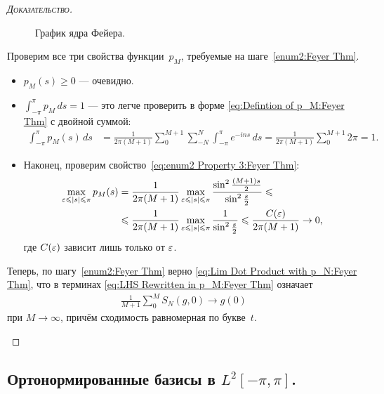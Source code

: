 \documentclass[../complex-analysis.tex]{subfiles}
\begin{document}
\begin{proof}[\normalfont\textsc{Доказательство}]
\begin{enumerate}
   \begin{figure}[ht]
    \centering
    \caption{График ядра Фейера.}
    \label{fig:feyer_kernel_plot}
   \end{figure}

   Проверим все три свойства функции~$ p_M $, требуемые на шаге~\ref{enum2:Feyer Thm}.
   \begin{itemize}
    \item $ p_M(s) \geqslant 0 $ --- очевидно.
    \item $ \int_{-\pi}^{\pi} p_M\,ds = 1 $ --- это легче проверить в форме \eqref{eq:Defintion of p_M:Feyer Thm} с двойной суммой:
     \begin{align*}
      \int_{-\pi}^{\pi} p_M(s)\,ds &= \frac{1}{2 \pi (M+1)} \sum_{0}^{M+1} \sum_{-N}^{N} \int_{-\pi}^{\pi} e^{-ins}\,ds = \frac{1}{2 \pi (M+1)} \sum_{0}^{M+1} 2\pi = 1.
     \end{align*}
    \item Наконец, проверим свойство~\eqref{eq:enum2 Property 3:Feyer Thm}:
     \begin{align*}
      \max_{\varepsilon \leqslant \left| s \right| \leqslant \pi} p_M(s) &=  \frac{1}{2\pi(M+1)} \max_{\varepsilon \leqslant \left| s \right| \leqslant \pi} \frac{\sin^{2} \frac{(M+1)s}{2}}{\sin^{2} \frac{s}{2}} \leqslant \\
      &\leqslant \frac{1}{2\pi(M+1)} \max_{\varepsilon \leqslant \left| s \right| \leqslant \pi} \frac{1}{\sin^{2} \frac{s}{2}} \leqslant \frac{C(\varepsilon)}{2\pi (M+1)} \to 0,
     \end{align*} где $ C(\varepsilon) $ зависит лишь только от $ \varepsilon $.
   \end{itemize}
   Теперь, по шагу~\ref{enum2:Feyer Thm} верно \eqref{eq:Lim Dot Product with p_N:Feyer Thm}, что в терминах \eqref{eq:LHS Rewritten in p_M:Feyer Thm} означает
   \begin{align*}
    \frac{1}{M+1} \sum_{0}^{M} S_N(g,0) \to g(0)
   \end{align*} при $ M \to \infty $, причём сходимость равномерная по букве~$ t $.
 \end{enumerate}
\end{proof}

\subsection{Ортонормированные базисы в \texorpdfstring{$L^{2}[-\pi, \pi]$}{пространстве Лебега}.}
\end{document}
